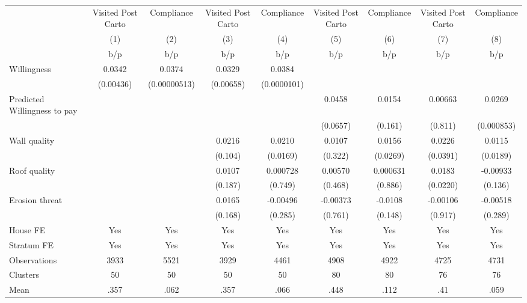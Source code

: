 {
\def\sym#1{\ifmmode^{#1}\else\(^{#1}\)\fi}
\begin{tabular}{l*{8}{c}}
\toprule
                &\multicolumn{1}{c}{Visited Post Carto}&\multicolumn{1}{c}{Compliance}&\multicolumn{1}{c}{Visited Post Carto}&\multicolumn{1}{c}{Compliance}&\multicolumn{1}{c}{Visited Post Carto}&\multicolumn{1}{c}{Compliance}&\multicolumn{1}{c}{Visited Post Carto}&\multicolumn{1}{c}{Compliance}\\
                &\multicolumn{1}{c}{(1)}&\multicolumn{1}{c}{(2)}&\multicolumn{1}{c}{(3)}&\multicolumn{1}{c}{(4)}&\multicolumn{1}{c}{(5)}&\multicolumn{1}{c}{(6)}&\multicolumn{1}{c}{(7)}&\multicolumn{1}{c}{(8)}\\
                &      b/p&      b/p&      b/p&      b/p&      b/p&      b/p&      b/p&      b/p\\
\midrule
Willingness     &   0.0342&   0.0374&   0.0329&   0.0384&         &         &         &         \\
                &(0.00436)&(0.00000513)&(0.00658)&(0.0000101)&         &         &         &         \\
Predicted Willingness to pay&         &         &         &         &   0.0458&   0.0154&  0.00663&   0.0269\\
                &         &         &         &         & (0.0657)&  (0.161)&  (0.811)&(0.000853)\\
Wall quality    &         &         &   0.0216&   0.0210&   0.0107&   0.0156&   0.0226&   0.0115\\
                &         &         &  (0.104)& (0.0169)&  (0.322)& (0.0269)& (0.0391)& (0.0189)\\
Roof quality    &         &         &   0.0107& 0.000728&  0.00570& 0.000631&   0.0183& -0.00933\\
                &         &         &  (0.187)&  (0.749)&  (0.468)&  (0.886)& (0.0220)&  (0.136)\\
Erosion threat  &         &         &   0.0165& -0.00496& -0.00373&  -0.0108& -0.00106& -0.00518\\
                &         &         &  (0.168)&  (0.285)&  (0.761)&  (0.148)&  (0.917)&  (0.289)\\
House FE        &      Yes&      Yes&      Yes&      Yes&      Yes&      Yes&      Yes&      Yes\\
Stratum FE      &      Yes&      Yes&      Yes&      Yes&      Yes&      Yes&      Yes&      Yes\\
\midrule
Observations    &     3933&     5521&     3929&     4461&     4908&     4922&     4725&     4731\\
Clusters        &       50&       50&       50&       50&       80&       80&       76&       76\\
Mean            &     .357&     .062&     .357&     .066&     .448&     .112&      .41&     .059\\
\bottomrule
\end{tabular}
}
